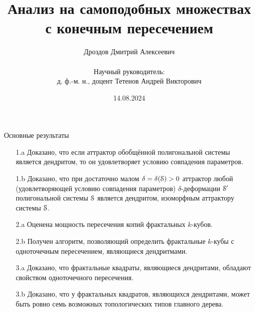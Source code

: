 \documentclass[aspectratio=1610, 10pt, notheorems]{beamer}
\title[Анализ на самоподобных множествах с конечным пересечением]
    {Анализ на самоподобных множествах с конечным пересечением}
\author[Дмитрий Дроздов]
    {Дроздов Дмитрий Алексеевич\\ \; \\
    Научный руководитель:\\ 
    д. ф.-м. н., доцент Тетенов Андрей Викторович}
\institute[ИМ СО РАН]{\large Институт математики имени С. Л. Соболева СО РАН}
\date[14.08.2024]{14.08.2024}
\begin{document}
\Large


\begin{frame}{}
\titlepage
\end{frame}


\begin{frame}{Основные результаты}

{\large
\begin{itemize}
\item[1.a] Доказано, что если аттрактор обобщённой полигональной системы является дендритом, то он удовлетворяет условию совпадения параметров.
\item[1.b] Доказано, что при достаточно малом $\delta=\delta({\EuScript S})>0$ аттрактор любой (удовлетворяющей условию совпадения параметров) $\delta$-деформации ${\EuScript S}'$  полигональной системы ${\EuScript S}$ является дендритом, изоморфным аттрактору системы ${\EuScript S}$.
\item[2.a] Оценена мощность пересечения копий фрактальных $k$-кубов.
\item[2.b] Получен алгоритм, позволяющий определить фрактальные $k$-кубы с одноточечным пересечением, являющиеся дендритмами.
\item[3.a] Доказано, что фрактальные квадраты, являющиеся дендритами, обладают свойством одноточечного пересечения.

\item[3.b] Доказано, что у фрактальных квадратов, являющихся дендритами, может быть ровно семь возможных топологических типов главного дерева.
\end{itemize}}
\end{frame}
\end{document}
